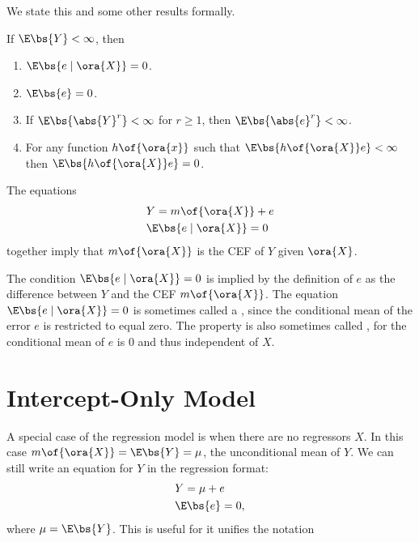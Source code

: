 We state this and some other results formally.

\begin{theorem}
    \label{hansen_thm_2_4}
    If $\E\bs{Y} < \infty$, then 
    \begin{enumerate}[topsep=10pt, leftmargin=20pt, itemsep=0pt, label=(\arabic*)]
        \setlength{\parskip}{10pt} 
        \item $\E\bs{e \mid \ora{X}} = 0$.
        \item $\E\bs{e} = 0$.
        \item If $\E\bs{\abs{Y}^r} < \infty$ for $r \geq 1$, then $\E\bs{\abs{e}^r}<\infty$.
        \item For any function $h\of{\ora{x}}$ such that $\E\bs{h\of{\ora{X}}e} < \infty$ then $\E\bs{h\of{\ora{X}}e} = 0$.
    \end{enumerate}
\end{theorem}

The equations
\begin{equation}
    \notag
    \begin{aligned}
        & Y = m\of{\ora{X}} + e \\
        & \E\bs{e \mid \ora{X}} = 0
    \end{aligned}
\end{equation}
together imply that $m\of{\ora{X}}$ is the CEF of $Y$ given $\ora{X}$. 

The condition $\E\bs{e \mid \ora{X}}=0$ is implied by the definition of $e$ as the difference between $Y$ and the CEF $m\of{\ora{X}}$. The equation $\E\bs{e \mid \ora{X}} = 0$ is sometimes called a , since the conditional mean of the error $e$ is restricted to equal zero. The property is also sometimes called , for the conditional mean of $e$ is 0 and thus independent of $X$. 

\section{Intercept-Only Model}

A special case of the regression model is when there are no regressors $X$. In this case $m\of{\ora{X}} = \E\bs{Y} = \mu$, the unconditional mean of $Y$. We can still write an equation for $Y$ in the regression format:
\begin{equation}
    \notag
    \begin{aligned}
        & Y = \mu + e \\
        & \E\bs{e} = 0,
    \end{aligned}
\end{equation}
where $\mu = \E\bs{Y}$. This is useful for it unifies the notation


